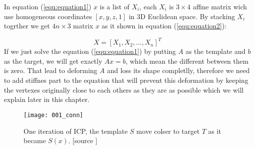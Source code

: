 \documentclass[../structure.tex]{subfiles}
\begin{document}
\hspace{2em}In equation (\ref{equ:equation1}) $x$ is a list of $X_i$, each $X_i$ is $3\times4$ affine matrix wich use homogeneous coordinates $[x,y,z,1]$ in 3D Euclidean space. By stacking $X_i$ togrther we get $4n\times3$ matrix $x$ as it shown in equation (\ref{equ:equation2}):

\begin{equation}
\label{equ:equation2}
X = [X_1, X_2, ... ,X_n]^T
\end{equation}
If we just solve the equation (\ref{equ:equation1}) by putting $A$ as the template and $b$ as the target, we will get exactly $Ax=b$, which mean the different between them is zero. That lead to deforming $A$ and loss its shape completlly, therefore we need to add stiffnes part to the equation that will prevent this deformation by keeping the vertexes originally close to each others as they are as possible which we will explain later in this chapter.

\begin{figure}[t]
\centering
\texttt{[image: 001\_conn]}
\captionsetup{justification=centering}
\caption{One iteration of ICP, the template $S$ move colser to target $T$ as it became $S(x)$. [source \cite{Amberg2007}]}
\label{fig:figure1}
\end{figure}
\end{document}
